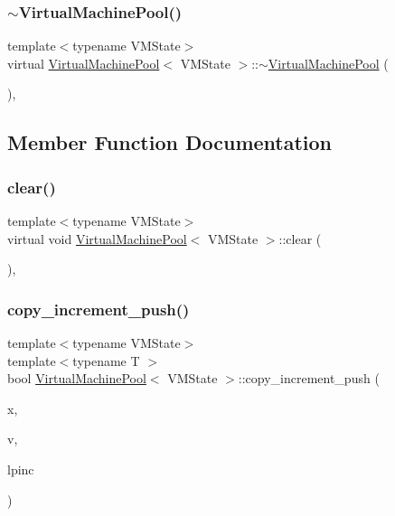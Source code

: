 \subsubsection{\texorpdfstring{$\sim$\+Virtual\+Machine\+Pool()}{~VirtualMachinePool()}}
{\footnotesize\ttfamily template$<$typename V\+M\+State$>$ \\
virtual \hyperlink{class_virtual_machine_pool}{Virtual\+Machine\+Pool}$<$ V\+M\+State $>$\+::$\sim$\hyperlink{class_virtual_machine_pool}{Virtual\+Machine\+Pool} (\begin{DoxyParamCaption}{ }\end{DoxyParamCaption})\hspace{0.3cm}{\ttfamily [inline]}, {\ttfamily [virtual]}}



\subsection{Member Function Documentation}
\mbox{\label{class_virtual_machine_pool_a9725415d6cff1c51d78545e7c905af8c}} 
\subsubsection{\texorpdfstring{clear()}{clear()}}
{\footnotesize\ttfamily template$<$typename V\+M\+State$>$ \\
virtual void \hyperlink{class_virtual_machine_pool}{Virtual\+Machine\+Pool}$<$ V\+M\+State $>$\+::clear (\begin{DoxyParamCaption}{ }\end{DoxyParamCaption})\hspace{0.3cm}{\ttfamily [inline]}, {\ttfamily [virtual]}}

\mbox{\label{class_virtual_machine_pool_a12fc289f4e95e856416aa5ea55389f30}} 
\subsubsection{\texorpdfstring{copy\+\_\+increment\+\_\+push()}{copy\_increment\_push()}}
{\footnotesize\ttfamily template$<$typename V\+M\+State$>$ \\
template$<$typename T $>$ \\
bool \hyperlink{class_virtual_machine_pool}{Virtual\+Machine\+Pool}$<$ V\+M\+State $>$\+::copy\+\_\+increment\+\_\+push (\begin{DoxyParamCaption}\item[{const V\+M\+State $\ast$}]{x,  }\item[{T}]{v,  }\item[{double}]{lpinc }\end{DoxyParamCaption})\hspace{0.3cm}{\ttfamily [inline]}}

